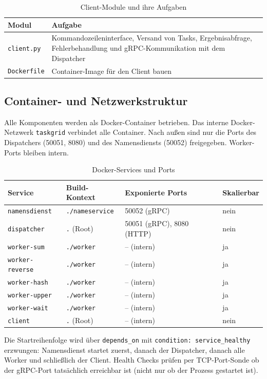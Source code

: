 \begin{table}[H]
	\centering
	\begin{tabular}{m{2.5cm} m{12.5cm}}
		\toprule
		\textbf{Modul} & \textbf{Aufgabe} \\
		\midrule
		\texttt{client.py} & Kommandozeileninterface, Versand von Tasks, Ergebnisabfrage, Fehlerbehandlung und gRPC-Kommunikation mit dem Dispatcher \\
		\texttt{Dockerfile} & Container-Image für den Client bauen \\
		\bottomrule
	\end{tabular}
	\caption{Client-Module und ihre Aufgaben}
\end{table}

\subsection{Container- und Netzwerkstruktur}
\label{sec:container}

Alle Komponenten werden als Docker-Container betrieben.
Das interne Docker-Netzwerk \texttt{taskgrid} verbindet alle Container.
Nach außen sind nur die Ports des Dispatchers (50051, 8080) und
des Namensdiensts (50052) freigegeben.
Worker-Ports bleiben intern.

\begin{table}[H]
\centering
\begin{tabular}{llll}
\toprule
\textbf{Service}      & \textbf{Build-Kontext} & \textbf{Exponierte Ports} & \textbf{Skalierbar} \\
\midrule
\texttt{namensdienst} & \texttt{./nameservice} & 50052 (gRPC)              & nein \\
\texttt{dispatcher}   & \texttt{.} (Root)      & 50051 (gRPC), 8080 (HTTP) & nein \\
\texttt{worker-sum}   & \texttt{./worker}      & -- (intern)               & ja \\
\texttt{worker-reverse} & \texttt{./worker}    & -- (intern)               & ja \\
\texttt{worker-hash}  & \texttt{./worker}      & -- (intern)               & ja \\
\texttt{worker-upper} & \texttt{./worker}      & -- (intern)               & ja \\
\texttt{worker-wait}  & \texttt{./worker}      & -- (intern)               & ja \\
\texttt{client}       & \texttt{.} (Root)      & -- (intern)               & nein \\
\bottomrule
\end{tabular}
\caption{Docker-Services und Ports}
\end{table}
\noindent Die Startreihenfolge wird über \texttt{depends\_on} mit
\texttt{condition: service\_healthy} erzwungen:
Namensdienst startet zuerst, danach der Dispatcher,
danach alle Worker und schließlich der Client.
Health Checks prüfen per TCP-Port-Sonde ob der gRPC-Port
tatsächlich erreichbar ist (nicht nur ob der Prozess gestartet ist).
